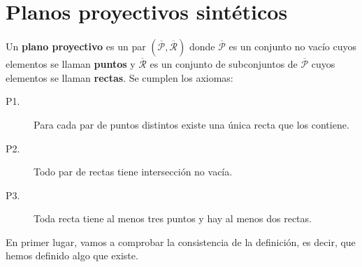 \section{Planos proyectivos sintéticos}
\begin{definition}
Un \textbf{plano proyectivo} es un par $\displaystyle \left(\overline{\mathcal{P}}, \overline{\mathcal{R}}\right) $ donde $\displaystyle \overline{\mathcal{P}} $ es un conjunto no vacío cuyos elementos se llaman \textbf{puntos} y $\displaystyle \overline{\mathcal{R}} $ es un conjunto de subconjuntos de $\displaystyle \overline{\mathcal{P}} $ cuyos elementos se llaman \textbf{rectas}. Se cumplen los axiomas:
\begin{description}
\item[P1.] Para cada par de puntos distintos existe una única recta que los contiene.
\item[P2.] Todo par de rectas tiene intersección no vacía.
\item[P3.] Toda recta tiene al menos tres puntos y hay al menos dos rectas.
\end{description}
\end{definition}
En primer lugar, vamos a comprobar la consistencia de la definición, es decir, que hemos definido algo que existe.
